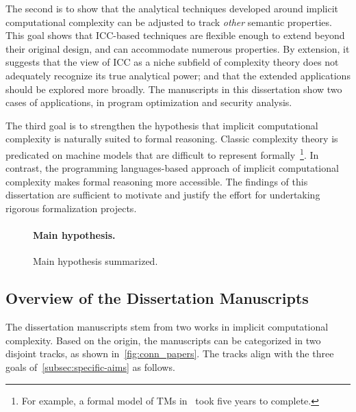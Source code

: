 The second is to show that the analytical techniques developed around implicit computational complexity can be adjusted to track \emph{other} semantic properties.
This goal shows that ICC-based techniques are flexible enough to extend beyond their original design, and can accommodate numerous properties.
By extension, it suggests that the view of ICC as a niche subfield of complexity theory does not adequately recognize its true analytical power;
and that the extended applications should be explored more broadly.
The manuscripts in this dissertation show two cases of applications, in program optimization and security analysis.
 
The third goal is to strengthen the hypothesis that implicit computational complexity is naturally suited to formal reasoning.
Classic complexity theory is predicated on machine models that are difficult to represent formally~\footnote{
For example, a formal model of TMs in~\textcite{forster2020} took five years to complete.}.
In contrast, the programming languages-based approach of implicit computational complexity makes formal reasoning more accessible.
The findings of this dissertation are sufficient to motivate and justify the effort for undertaking rigorous formalization projects.

\begin{figure}[t]
    \begin{mdframed}
        \paragraph*{Main hypothesis.}
        \color{red}{write here very clearly.}
    \end{mdframed}
    \caption[Main hypothesis summarized]
    {Main hypothesis summarized.}
    \label{fig:hypothesis}
\end{figure}

\subsection{Overview of the Dissertation Manuscripts}
\label{subsec:conn-papers}

The dissertation manuscripts stem from two works in implicit computational complexity.
Based on the origin, the manuscripts can be categorized in two disjoint tracks, as shown in~\autoref{fig:conn_papers}.
The tracks align with the three goals of~\autoref{subsec:specific-aims} as follows.

